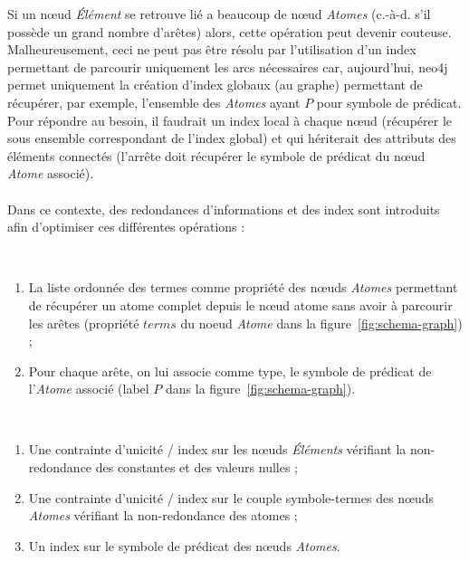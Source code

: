 Si un nœud \textit{Élément} se retrouve lié a beaucoup de nœud \textit{Atomes} (c.-à-d. s'il possède un grand nombre d'arêtes) alors, cette opération peut devenir couteuse.
Malheureusement, ceci ne peut pas être résolu par l'utilisation d'un index permettant de parcourir uniquement les arcs nécessaires car, aujourd'hui, \gls{neo4j} permet uniquement la création d'index globaux (au graphe) permettant de récupérer, par exemple, l'ensemble des \textit{Atomes} ayant $P$ pour symbole de prédicat.
Pour répondre au besoin, il faudrait un index local à chaque nœud (récupérer le sous ensemble correspondant de l'index global) et qui hériterait des attributs des éléments connectés (l'arrête doit récupérer le symbole de prédicat du nœud \textit{Atome} associé).

\paragraph{}
Dans ce contexte, des redondances d'informations et des index sont introduits afin d'optimiser ces différentes opérations :
\begin{description}[wide=0pt]
    \item[Limiter le parcours des arêtes] ~
        \begin{enumerate}
            \item La liste ordonnée des termes comme propriété des nœuds \textit{Atomes} permettant de récupérer un atome complet depuis le nœud atome sans avoir à parcourir les arêtes (propriété $terms$ du noeud \textit{Atome} dans la figure~\ref{fig:schema-graph}) ;
            \item Pour chaque arête, on lui associe comme type, le symbole de prédicat de l'\textit{Atome} associé (label $P$ dans la figure~\ref{fig:schema-graph}).
        \end{enumerate}
    \item[Faciliter la récupération des nœuds] ~
        \begin{enumerate}
            \item Une contrainte d'unicité / index sur les nœuds \textit{Éléments} vérifiant la non-redondance des constantes et des valeurs nulles ;
            \item Une contrainte d'unicité / index sur le couple symbole-termes des nœuds \textit{Atomes} vérifiant la non-redondance des atomes ;
            \item Un index sur le symbole de prédicat des nœuds \textit{Atomes}.
        \end{enumerate}
\end{description}

